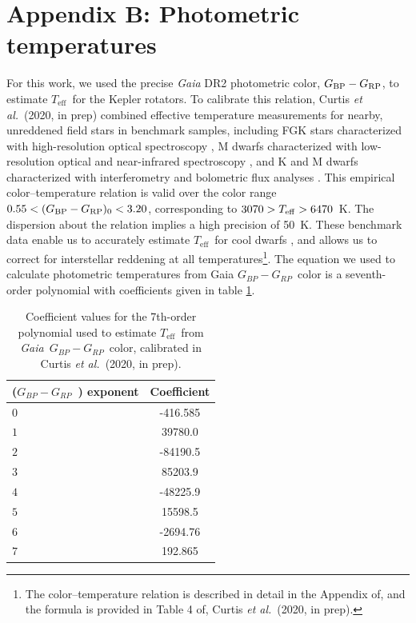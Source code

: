 \documentclass{aastex63}
\newcommand{\eg}{{\it e.g.}}
\newcommand{\etal}{{\it et al.}}
\newcommand{\Gaia}{{\it Gaia}}
\newcommand{\teff}{$T_{\mathrm{eff}}$}
\newcommand{\gcolor}{$G_{BP} - G_{RP}$}
\newcommand{\racomment}[1]{{\color{blue}#1}}
\begin{document}
\racomment{
\section{Appendix B: Photometric temperatures}

For this work, we used the precise \textit{Gaia} DR2 photometric color,
$G_{\rm BP} - G_{\rm RP}$, to estimate \teff\ for the Kepler rotators.
To calibrate this relation, Curtis \etal\ (2020, in prep) combined effective
temperature measurements for nearby, unreddened field stars in benchmark
samples, including FGK stars characterized with high-resolution optical
spectroscopy \citep{brewer2016}, M dwarfs characterized with low-resolution
optical and near-infrared spectroscopy \citep{mann2015}, and K and M dwarfs
characterized with interferometry and bolometric flux analyses
\citep{boyajian2012}.
This empirical color--temperature relation is valid over the color range $0.55
< (G_{\rm BP} - G_{\rm RP})_0 < 3.20$, corresponding to $3070 > T_{\rm eff} >
6470$~K.
The dispersion about the relation implies a high precision of 50~K.
These benchmark data enable us to accurately estimate \teff\ for cool dwarfs
\citep[\eg][]{rabus2019}, and allows us to correct for interstellar reddening
at all temperatures\footnote{The color--temperature relation is described in
detail in the Appendix of, and the formula is provided in Table 4 of, Curtis
\etal\ (2020, in prep).}.
The equation we used to calculate photometric temperatures from Gaia \gcolor\
color is a seventh-order polynomial with coefficients given in table
\ref{tab:coeffs}.
\begin{table}[h!]
  \begin{center}
      \caption{
          Coefficient values for the 7th-order polynomial used to estimate
      \teff\ from \Gaia\ \gcolor\ color, calibrated in Curtis \etal\ (2020, in
      prep).}
    \label{tab:coeffs}
    \begin{tabular}{l|c} %
        (\gcolor\ ) exponent & Coefficient  \\
      \hline
      $0$ & -416.585 \\
      $1$ & 39780.0  \\
      $2$ & -84190.5 \\
      $3$ & 85203.9  \\
      $4$ & -48225.9 \\
      $5$ & 15598.5  \\
      $6$ & -2694.76 \\
      $7$ & 192.865  \\
    \end{tabular}
  \end{center}
\end{table}
}
\end{document}
